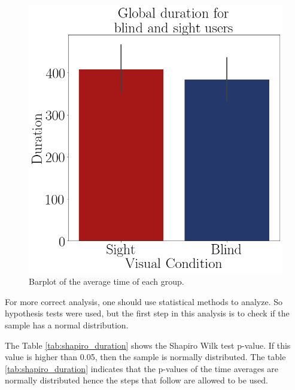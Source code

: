 \begin{figure}[!htb]
\begin{minipage}{.45\linewidth}
    \end{minipage}
    \begin{minipage}{.1\linewidth}
        \hfill
    \end{minipage}
    \begin{minipage}{.45\linewidth}
        \centering
        \vspace{1.8cm}
        \includegraphics[width = \linewidth]{Resultados/Tempo/Figuras/png/barplot_duration_global.png}
        \caption{Barplot of the average time of each group.}
        \label{fig:barplot_duration_global}
    \end{minipage}
\end{figure}

For more correct analysis, one should use statistical methods to analyze. So hypothesis tests were used, but the first step in this analysis is to check if the sample has a normal distribution. 

The Table \ref{tab:shapiro_duration} shows the Shapiro Wilk test p-value. If this value is higher than 0.05, then the sample is normally distributed. The table \ref{tab:shapiro_duration} indicates that the p-values of the time averages are normally distributed hence the steps that follow are allowed to be used.


